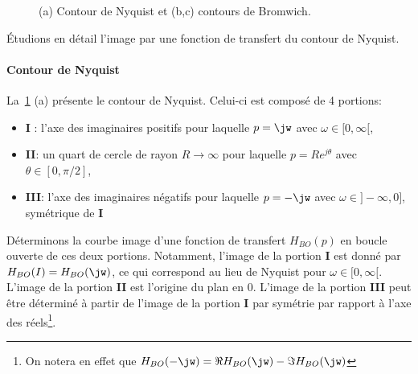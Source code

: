 \begin{figure}[!h]
\begin{center}
\end{center}
\caption{(a) Contour de Nyquist et (b,c) contours de Bromwich.\label{fig-contours}} 
\end{figure}

\'Etudions en détail l'image par une fonction de transfert du contour de Nyquist.

\paragraph{Contour de Nyquist}

La~\cref{fig-contours} (a) présente le contour de Nyquist. Celui-ci est composé de 4 portions:
\begin{itemize}
    \item \textbf{I} : l'axe des imaginaires positifs pour laquelle $p=\jw$ avec $\omega\in[0,\infty[$,
    \item \textbf{II}: un quart de cercle de rayon $R\rightarrow\infty$ pour laquelle $p=Re^{j\theta}$ avec $\theta\in[0,\pi/2]$,
    \item \textbf{III}: l'axe des imaginaires négatifs  pour laquelle $p=-\jw$ avec $\omega\in]-\infty,0]$, symétrique de \textbf{I}
\end{itemize}


Déterminons la courbe image d'une fonction de transfert $H_{BO}(p)$
en boucle ouverte de ces deux portions. 
Notamment, l'image de la portion \textbf{I} est donné par $H_{BO}(I)=H_{BO}(\jw)$, 
ce qui correspond au lieu de Nyquist pour $\omega\in[0,\infty[$. 
L'image de la portion \textbf{II} est l'origine du plan en 0. L'image de la 
portion \textbf{III} peut être déterminé à partir de l'image de la 
portion \textbf{I} par symétrie par rapport à l'axe des réels\footnote{On notera 
en effet que $H_{BO}(-\jw)=\Re{H_{BO}(\jw)}-\Im{H_{BO}(\jw)}$}.



